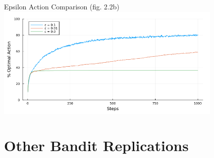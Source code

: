 \documentclass{beamer}
\begin{document}
    \begin{frame}{Epsilon Action Comparison (fig. 2.2b)}
  	\includegraphics[width=11cm]{ten_armed_testbed_epsilon_optimal.png}
  \end{frame}
  
  \section{Other Bandit Replications}
  
\end{document}
